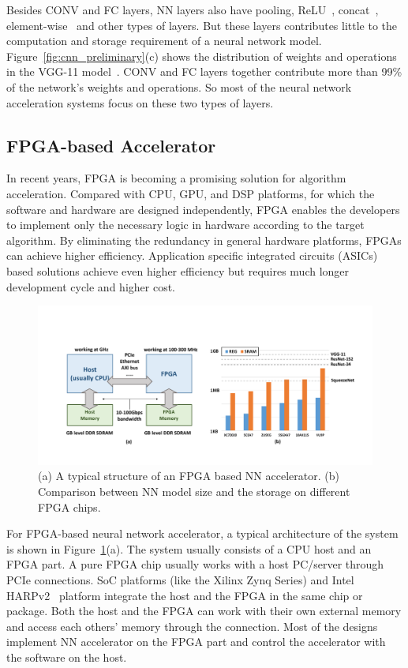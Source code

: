 Besides CONV and FC layers, NN layers also have pooling, ReLU~\cite{krizhevsky2012imagenet}, concat~\cite{szegedy2015going}, element-wise~\cite{he2016deep} and other types of layers. But these layers contributes little to the computation and storage requirement of a neural network model. Figure~\ref{fig:cnn_preliminary}(c) shows the distribution of weights and operations in the VGG-11 model~\cite{simonyan2014very}. CONV and FC layers together contribute more than 99\% of the network's weights and operations. So most of the neural network acceleration systems focus on these two types of layers.


\subsection{FPGA-based Accelerator}\label{sec:preliminary:fpga}

In recent years, FPGA is becoming a promising solution for algorithm acceleration. Compared with CPU, GPU, and DSP platforms, for which the software and hardware are designed independently, FPGA enables the developers to implement only the necessary logic in hardware according to the target algorithm. By eliminating the redundancy in general hardware platforms, FPGAs can achieve higher efficiency. Application specific integrated circuits (ASICs) based solutions achieve even higher efficiency but requires much longer development cycle and higher cost. 

\begin{figure}[ht]
    \centering
    \includegraphics[width=0.8\columnwidth]{fig/fpga_preliminary.pdf}
    \caption{(a) A typical structure of an FPGA based NN accelerator. (b) Comparison between NN model size and the storage on different FPGA chips.}
    \label{fig:fpga_preliminary}
\end{figure}

For FPGA-based neural network accelerator, a typical architecture of the system is shown in Figure~\ref{fig:fpga_preliminary}(a). The system usually consists of a CPU host and an FPGA part. A pure FPGA chip usually works with a host PC/server through PCIe connections. SoC platforms (like the Xilinx Zynq Series) and Intel HARPv2~\cite{gupta2016accelerating} platform integrate the host and the FPGA in the same chip or package. Both the host and the FPGA can work with their own external memory and access each others' memory through the connection. Most of the designs implement NN accelerator on the FPGA part and control the 
accelerator with the software on the host.

